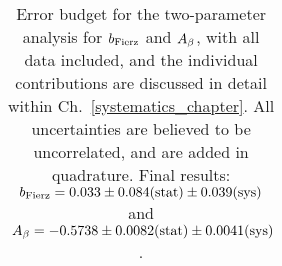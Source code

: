 \begin{table}[h!!!!t]
\begin{center}
\begin{tabular}{ l  c  c  }
	\end{tabular}
	\end{center}
	\caption[Error Budget]{Error budget for the two-parameter analysis for $b_{\mathrm{Fierz}}$ and $A_{\beta}$, with all data included, and the individual contributions are discussed in detail within Ch.~\ref{systematics_chapter}.  All uncertainties are believed to be uncorrelated, and are added in quadrature.  Final results: 
	$\mbox{ $b_{\mathrm{Fierz}} = 0.033 \pm 0.084(\textrm{stat}) \pm 0.039(\textrm{sys})$ }$ and $\mbox{ $A_{\beta} = -0.5738 \pm 0.0082(\textrm{stat}) \pm 0.0041(\textrm{sys})$}$. }
	\label{table:budget}
\end{table}





